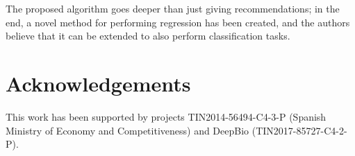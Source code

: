 \documentclass[a4paper,twoside]{article}
\begin{document}
The proposed 
algorithm goes deeper than just giving recommendations; in the end, a
novel method for performing regression has been created, and the authors
believe that it can be extended to also perform classification tasks.


\section{Acknowledgements}

This work has been supported by
projects TIN2014-56494-C4-3-P (Spanish Ministry of Economy and
Competitiveness) and DeepBio (TIN2017-85727-C4-2-P).



\end{document}
